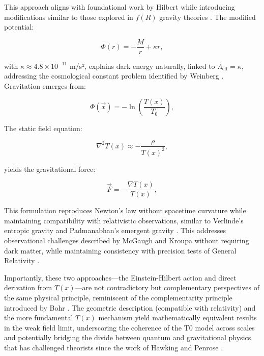 \documentclass[twocolumn,aps,prl]{revtex4-2}
\begin{document}
	This approach aligns with foundational work by Hilbert \cite{Hilbert1924} while introducing modifications similar to those explored in $f(R)$ gravity theories \cite{Sotiriou2010, DeFelice2010}. The modified potential:
	
	\begin{equation}
		\Phi(r) = -\frac{M}{r} + \kappa r, \label{eq:mod_potential}
	\end{equation}
	
	with $\kappa \approx 4.8 \times 10^{-11}$ m/s², explains dark energy naturally, linked to $\Lambda_{\text{eff}} = \kappa$, addressing the cosmological constant problem identified by Weinberg \cite{Weinberg1989}. Gravitation emerges from:
	
	\begin{equation}
		\Phi(\vec{x}) = -\ln\left(\frac{T(x)}{T_0}\right), \label{eq:phi_from_t}
	\end{equation}
	
	The static field equation:
	
	\begin{equation}
		\nabla^2 T(x) \approx -\frac{\rho}{T(x)^2}, \label{eq:static_field}
	\end{equation}
	
	yields the gravitational force:
	
	\begin{equation}
		\vec{F} = -\frac{\nabla T(x)}{T(x)}, \label{eq:grav_force}
	\end{equation}
	
	This formulation reproduces Newton’s law without spacetime curvature while maintaining compatibility with relativistic observations, similar to Verlinde’s entropic gravity \cite{Verlinde2011} and Padmanabhan’s emergent gravity \cite{Padmanabhan2012}. This addresses observational challenges described by McGaugh \cite{McGaugh2011} and Kroupa \cite{Kroupa2012} without requiring dark matter, while maintaining consistency with precision tests of General Relativity \cite{Will2014}.
	
	Importantly, these two approaches—the Einstein-Hilbert action and direct derivation from $T(x)$—are not contradictory but complementary perspectives of the same physical principle, reminiscent of the complementarity principle introduced by Bohr \cite{Bohr1928}. The geometric description (compatible with relativity) and the more fundamental $T(x)$ mechanism yield mathematically equivalent results in the weak field limit, underscoring the coherence of the T0 model across scales and potentially bridging the divide between quantum and gravitational physics that has challenged theorists since the work of Hawking \cite{Hawking1975} and Penrose \cite{Penrose1965}.
	
\end{document}
